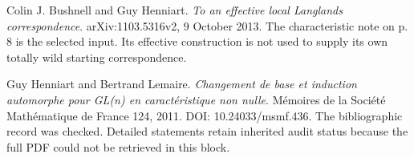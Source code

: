 \begin{description}[style=nextline,leftmargin=1.5cm,labelwidth=1.35cm,font=\normalfont\bfseries,before=\raggedright]
\item[{[BH13]}] Colin J. Bushnell and Guy Henniart. \emph{To an effective local Langlands correspondence}. arXiv:1103.5316v2, 9 October 2013. The characteristic note on p. 8 is the selected input. Its effective construction is not used to supply its own totally wild starting correspondence.
\item[{[HL11]}] Guy Henniart and Bertrand Lemaire. \emph{Changement de base et induction automorphe pour GL(n) en caract\'eristique non nulle}. M\'emoires de la Soci\'et\'e Math\'ematique de France 124, 2011. DOI: 10.24033/msmf.436. The bibliographic record was checked. Detailed statements retain inherited audit status because the full PDF could not be retrieved in this block.
\end{description}
